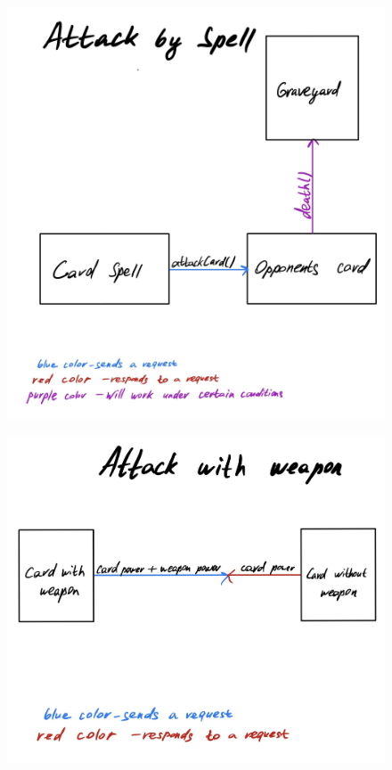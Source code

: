 \documentclass[12pt,a4paper]{article}
\begin{document}
\begin{figure}[h]
\centering 
\includegraphics[width=1\textwidth]{img/spell.jpg}
\end{figure}
\begin{figure}[h]
\centering 
\includegraphics[width=1\textwidth]{img/weapon.jpg}
\end{figure}
\end{document}
